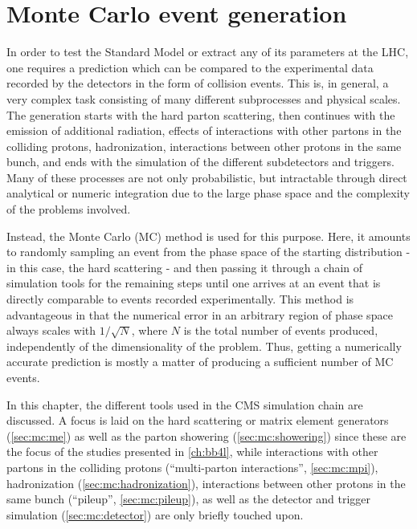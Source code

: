 \chapter{Monte Carlo event generation}
\label{ch:mc}


In order to test the Standard Model or extract any of its parameters at the LHC, one requires a prediction which can be compared to the experimental data recorded by the detectors in the form of collision events. This is, in general, a very complex task consisting of many different subprocesses and physical scales. The generation starts with the hard parton scattering, then continues with the emission of additional radiation, effects of interactions with other partons in the colliding protons, hadronization, interactions between other protons in the same bunch, and ends with the simulation of the different subdetectors and triggers. Many of these processes are not only probabilistic, but intractable through direct analytical or numeric integration due to the large phase space and the complexity of the problems involved.

Instead, the Monte Carlo (MC) method is used for this purpose. Here, it amounts to randomly sampling an event from the phase space of the starting distribution - in this case, the hard scattering - and then passing it through a chain of simulation tools for the remaining steps until one arrives at an event that is directly comparable to events recorded experimentally. %
This method is advantageous in that the numerical error in an arbitrary region of phase space always scales with $1/\sqrt{N}$, where $N$ is the total number of events produced, independently of the dimensionality of the problem. Thus, getting a numerically accurate prediction is mostly a matter of producing a sufficient number of MC events.

In this chapter, the different tools used in the CMS simulation chain are discussed. A focus is laid on the hard scattering or matrix element generators (\cref{sec:mc:me}) as well as the parton showering (\cref{sec:mc:showering}) since these are the focus of the studies presented in \cref{ch:bb4l}, while interactions with other partons in the colliding protons (``multi-parton interactions'', \cref{sec:mc:mpi}), hadronization (\cref{sec:mc:hadronization}), interactions between other protons in the same bunch (``pileup'', \cref{sec:mc:pileup}), as well as the detector and trigger simulation (\cref{sec:mc:detector}) are only briefly touched upon. 

